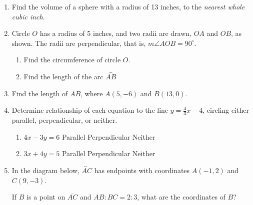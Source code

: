 \documentclass[12pt, twoside]{article}
\begin{document}
\begin{enumerate}
    \item Find the volume of a sphere with a radius of 13 inches, to the \emph{nearest whole cubic inch}. \vspace{3cm}

    \item Circle $O$ has a radius of 5 inches, and two radii are drawn, $OA$ and $OB$, as shown. The radii are perpendicular, that is, $m\angle AOB=90^\circ$.\\
    \begin{enumerate}
      \item Find the circumference of circle $O$. \vspace{1.5cm}
      \item Find the length of the arc $\stackrel\frown{AB}$
      \end{enumerate}

\newpage

   \item Find the length of $\overline{AB}$, where $A(5,-6)$ and $B(13,0)$.
       \vspace{4cm}

   \item Determine relationship of each equation to the line  $y=\frac{4}{3} x-4$, circling either parallel, perpendicular, or neither.
     \begin{enumerate}
       \item $4x-3y=6$ \hspace{1cm} Parallel \qquad Perpendicular \qquad Neither
       \vspace{1.5cm}
       \item $3x+4y=5$ \hspace{1cm} Parallel \qquad Perpendicular \qquad Neither
       \vspace{2.cm}
     \end{enumerate}

  \item In the diagram below, $\overleftrightarrow{AC}$ has endpoints with coordinates $A(-1,2)$ and $C(9, -3)$.
    \begin{center} %
    \end{center}
    If $B$ is a point on $\overline{AC}$ and $AB {:} BC = 2{:}3$,  what  are  the  coordinates of $B$?


\end{enumerate}
\end{document}
